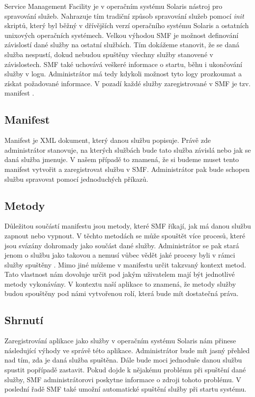 Service Management Facility je v operačním systému Solaris nástroj pro spravování služeb. Nahrazuje tím tradiční způsob spravování služeb pomocí \emph{init} skriptů, který byl běžný v dřívějších verzí operačního systému Solaris a ostatních unixových operačních systémech. Velkou výhodou SMF je možnost definování závislostí dané služby na ostatní službách. Tím dokážeme stanovit, že se daná služba nespustí, dokud nebudou spuštěny všechny služby stanovené v závislostech. SMF také uchovává veškeré informace o startu, běhu i ukončování služby v logu. Administrátor má tedy kdykoli možnost tyto logy prozkoumat a získat požadované informace. V pozadí každé služby zaregistrované v SMF je tzv. manifest \cite{SMF}.
    \subsection{Manifest}
    Manifest je XML dokument, který danou službu popisuje. Právě zde administrátor stanovuje, na kterých službách bude tato služba závislá nebo jak se daná služba jmenuje. V našem případě to znamená, že si budeme muset tento manifest vytvořit a zaregistrovat službu v SMF. Administrátor pak bude schopen službu spravovat pomocí jednoduchých příkazů.
    \subsection{Metody}
    Důležitou součástí manifestu jsou metody, které SMF říkají, jak má danou službu zapnout nebo vypnout. V těchto metodách se může spouštět více procesů, které jsou svázány dohromady jako součást dané služby. Administrátor se pak stará jenom o službu jako takovou a nemusí vůbec vědět jaké procesy byli v rámci služby spuštěny \cite{SMF}. Mimo jiné můžeme v manifestu určit takzvaný kontext metod. Tato vlastnost nám dovoluje určit pod jakým uživatelem mají být jednotlivé metody vykonávány. V kontextu naší aplikace to znamená, že metody služby budou spouštěny pod námi vytvořenou rolí, která bude mít dostatečná práva.
    \subsection{Shrnutí}
    Zaregistrování aplikace jako služby v operačním systému Solaris nám přinese následující výhody ve správě této aplikace. Administrátor bude mít jasný přehled nad tím, zda je daná služba spuštěna. Dále bude moci jednoduše danou službu spustit popřípadě zastavit. Pokud dojde k nějakému problému při spuštění dané služby, SMF administrátorovi poskytne informace o zdroji tohoto problému. V poslední řadě SMF také umožní automatické spuštění služby při startu systému.


